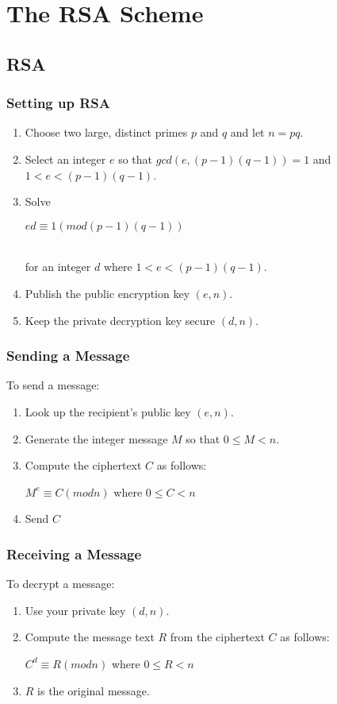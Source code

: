 \documentclass[12pt]{report}
\begin{document}
\chapter{The RSA Scheme}
	\section{RSA}
		\subsection{Setting up RSA}
			\begin{enumerate}
				\item Choose two large, distinct primes $p$ and $q$ and let $n = pq$.
				\item Select an integer $e$ so that $gcd(e, (p-1)(q-1)) = 1$ and $1 < e < (p-1)(q-1)$. 
				\item Solve\\
				\centerline{$ed \equiv 1 (mod (p-1)(q-1))$}\\
				for an integer $d$ where $1 < e < (p-1)(q-1)$.
				\item Publish the public encryption key $(e,n)$.
				\item Keep the private decryption key secure $(d,n)$.
			\end{enumerate}
		\subsection{Sending a Message}
			To send a message:
			\begin{enumerate}
				\item Look up the recipient's public key $(e, n)$.
				\item Generate the integer message $M$ so that $0 \leq M < n$.
				\item Compute the ciphertext $C$ as follows:\\
					\centerline{$M^e\equiv C (mod n)$ where $0 \leq C < n$}
				\item Send $C$
			\end{enumerate}
		\subsection{Receiving a Message}
			To decrypt a message:
			\begin{enumerate}
				\item Use your private key $(d,n)$. 
				\item Compute the message text $R$ from the ciphertext $C$ as follows:\\
					\centerline{$C^d \equiv R (mod n)$ where $0 \leq R < n$}
				\item $R$ is the original message.
			\end{enumerate}
\end{document}
